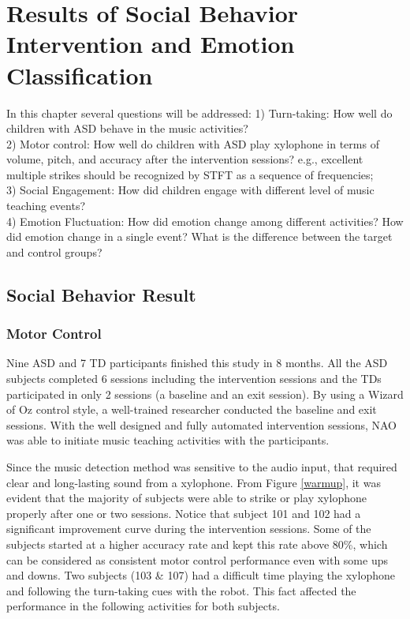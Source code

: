 \chapter{Results of Social Behavior Intervention and Emotion Classification}
In this chapter several questions will be addressed:
1) Turn-taking: How well do children with ASD behave in the music activities?\\
2) Motor control: How well do children with ASD play xylophone in terms of volume, pitch, and accuracy
after the intervention sessions? e.g., excellent multiple strikes should be recognized by 
STFT as a sequence of frequencies;\\
3) Social Engagement: How did children engage with different level of music teaching events?\\
4) Emotion Fluctuation: How did emotion change among different activities? How did emotion change in 
a single event? What is the difference between the target and control groups?\\

\section{Social Behavior Result}
\subsection{Motor Control}
Nine ASD and 7 TD participants finished this study in 8 months. All the ASD subjects completed 
6 sessions including the intervention sessions and the TDs participated in only 2 sessions (a baseline and an exit session). By using a Wizard of Oz control style, a well-trained researcher conducted the baseline and exit sessions. %
With the well designed and fully automated intervention sessions, NAO was
able to initiate music teaching activities with the participants. 

Since the music detection method was sensitive to the audio input, that required clear and long-lasting 
sound from a xylophone. From Figure \ref{warmup}, it was evident that the majority of subjects were able 
to strike or play xylophone properly after one or two sessions. Notice that subject 101 and 
102 had a significant improvement curve during the intervention sessions. Some of the subjects started 
at a higher accuracy rate and kept this rate above 80\%, which can be considered as consistent 
motor control performance even with some ups and downs. Two subjects (103 \& 107) had a difficult 
time playing the xylophone and following the turn-taking cues with the robot. This fact affected 
the performance in the following activities for both subjects.\\

